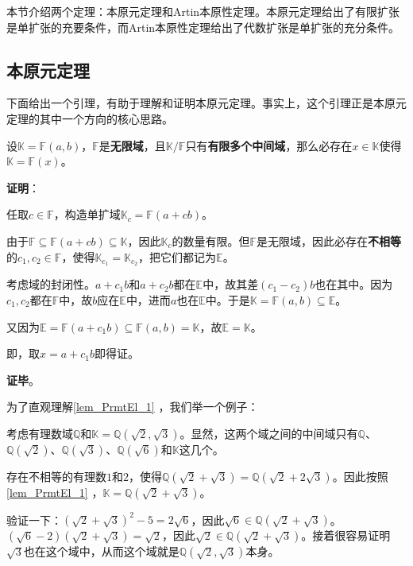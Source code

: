


本节介绍两个定理：本原元定理和Artin本原性定理。本原元定理给出了有限扩张是单扩张的充要条件，而Artin本原性定理给出了代数扩张是单扩张的充分条件。

\subsection{本原元定理}

下面给出一个引理，有助于理解和证明本原元定理。事实上，这个引理正是本原元定理的其中一个方向的核心思路。


\begin{lemma}{}\label{lem_PrmtEl_1}
设$\mathbb{K}=\mathbb{F}(a, b)$，$\mathbb{F}$是\textbf{无限域}，且$\mathbb{K}/\mathbb{F}$只有\textbf{有限多个中间域}，那么必存在$x\in\mathbb{K}$使得$\mathbb{K}=\mathbb{F}(x)$。
\end{lemma}

\textbf{证明}：

任取$c\in\mathbb{F}$，构造单扩域$\mathbb{K}_c=\mathbb{F}(a+cb)$。

由于$\mathbb{F}\subseteq\mathbb{F}(a+cb)\subseteq\mathbb{K}$，因此$\mathbb{K}_c$的数量有限。但$\mathbb{F}$是无限域，因此必存在\textbf{不相等}的$c_1, c_2\in\mathbb{F}$，使得$\mathbb{K}_{c_1}=\mathbb{K}_{c_2}$，把它们都记为$\mathbb{E}$。

考虑域的封闭性。$a+c_1b$和$a+c_2b$都在$\mathbb{E}$中，故其差$(c_1-c_2)b$也在其中。因为$c_1, c_2$都在$\mathbb{F}$中，故$b$应在$\mathbb{E}$中，进而$a$也在$\mathbb{E}$中。于是$\mathbb{K}=\mathbb{F}(a, b)\subseteq\mathbb{E}$。

又因为$\mathbb{E}=\mathbb{F}(a+c_1b)\subseteq\mathbb{F}(a, b)=\mathbb{K}$，故$\mathbb{E}=\mathbb{K}$。

即，取$x=a+c_1b$即得证。

\textbf{证毕}。


为了直观理解\autoref{lem_PrmtEl_1} ，我们举一个例子：

\begin{example}{}

考虑有理数域$\mathbb{Q}$和$\mathbb{K}=\mathbb{Q}(\sqrt{2}, \sqrt{3})$。显然，这两个域之间的中间域只有$\mathbb{Q}$、$\mathbb{Q}(\sqrt{2})$、$\mathbb{Q}(\sqrt{3})$、$\mathbb{Q}(\sqrt{6})$和$\mathbb{K}$这几个。

存在不相等的有理数$1$和$2$，使得$\mathbb{Q}(\sqrt{2}+\sqrt{3})=\mathbb{Q}(\sqrt{2}+2\sqrt{3})$。因此按照\autoref{lem_PrmtEl_1} ，$\mathbb{K}=\mathbb{Q}(\sqrt{2}+\sqrt{3})$。

验证一下：$(\sqrt{2}+\sqrt{3})^2-5=2\sqrt{6}$，因此$\sqrt{6}\in\mathbb{Q}(\sqrt{2}+\sqrt{3})$。$(\sqrt{6}-2)(\sqrt{2}+\sqrt{3})=\sqrt{2}$，因此$\sqrt{2}\in\mathbb{Q}(\sqrt{2}+\sqrt{3})$。接着很容易证明$\sqrt{3}$也在这个域中，从而这个域就是$\mathbb{Q}(\sqrt{2}, \sqrt{3})$本身。

\end{example}


